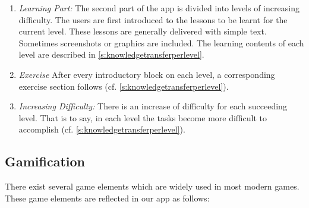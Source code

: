 \begin{enumerate}
\begin{enumerate}
	\item \textit{Learning Part:} The second part of the app is divided into levels of increasing difficulty.
The users are first introduced to the lessons to be learnt for the current level.
These lessons are generally delivered with simple text.
Sometimes screenshots or graphics are included.
 The learning contents of each level are described in \autoref{s:knowledgetransferperlevel}.
		\item \textit{Exercise} After every introductory block on each level, a corresponding exercise section follows (cf. \autoref{s:knowledgetransferperlevel}).
		\item \textit{Increasing Difficulty:} There is an increase of difficulty for each succeeding level.
 That is to say, in each level the tasks become more difficult to accomplish (cf. \autoref{s:knowledgetransferperlevel}).
\end{enumerate}
\end{enumerate}


\subsection{Gamification}
There exist several game elements which are widely used in most modern games.
These game elements are reflected in our app as follows:


